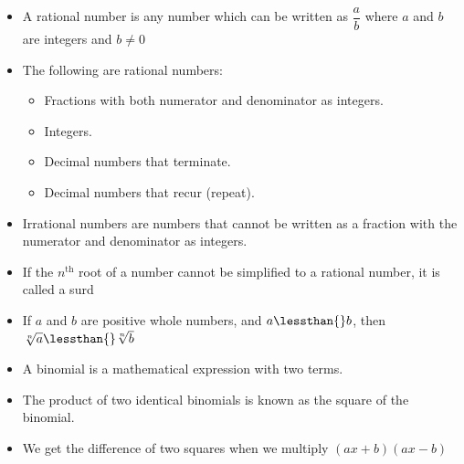 \begin{itemize}[itemsep=5pt, label=\textbullet{}]

\item  A rational number is any number which can be written as $\dfrac{a}{b}$
where $a$ and $b$ are integers and $b\ne 0$\item The following are rational numbers:
    \begin{itemize}[noitemsep]
	\item Fractions with both numerator and denominator as integers.
	\item Integers.
	\item Decimal numbers that terminate.
	\item Decimal numbers that recur (repeat).
    \end{itemize}
\item Irrational numbers are numbers that cannot be written as a fraction with the numerator and denominator as integers.
\item If the ${n}^{\mathrm{th}}$ root of a number cannot be simplified to a rational number, it is called a surd
\item If $a$ and $b$ are positive whole numbers, and $a\lessthan{}b$, then $\sqrt[n]{a}\lessthan{}\sqrt[n]{b}$
\item A binomial is a mathematical expression with two terms. 
\item The product of two identical binomials is known as the square of the binomial. 
\item We get the difference of two squares when we multiply $\left(ax+b\right)\left(ax-b\right)$

\end{itemize}
